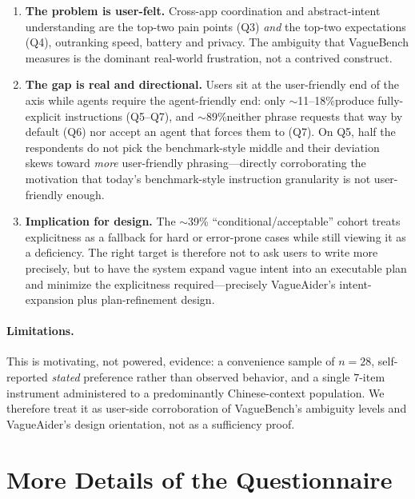 \documentclass[11pt]{article}
\newcommand{\pct}{\%}
\begin{document}
\begin{enumerate}
  \item \textbf{The problem is user-felt.} Cross-app coordination and
  abstract-intent understanding are the top-two pain points (Q3) \emph{and} the
  top-two expectations (Q4), outranking speed, battery and privacy. The
  ambiguity that VagueBench measures is the dominant real-world frustration, not
  a contrived construct.
  \item \textbf{The gap is real and directional.} Users sit at the
  user-friendly end of the axis while agents require the agent-friendly end:
  only $\sim$11--18\pct produce fully-explicit instructions (Q5--Q7), and
  $\sim$89\pct neither phrase requests that way by default (Q6) nor accept an
  agent that forces them to (Q7). On Q5, half the respondents do not pick the
  benchmark-style middle and their deviation skews toward \emph{more}
  user-friendly phrasing---directly corroborating the motivation that today's
  benchmark-style instruction granularity is not user-friendly enough.
  \item \textbf{Implication for design.} The $\sim$39\pct
  ``conditional/acceptable'' cohort treats explicitness as a fallback for hard
  or error-prone cases while still viewing it as a deficiency. The right target
  is therefore not to ask users to write more precisely, but to have the system
  expand vague intent into an executable plan and minimize the explicitness
  required---precisely VagueAider's intent-expansion plus plan-refinement design.
\end{enumerate}

\paragraph{Limitations.}
This is motivating, not powered, evidence: a convenience sample of $n{=}28$,
self-reported \emph{stated} preference rather than observed behavior, and a
single $7$-item instrument administered to a predominantly Chinese-context
population. We therefore treat it as user-side corroboration of VagueBench's
ambiguity levels and VagueAider's design orientation, not as a sufficiency proof.


\appendix
\section{More Details of the Questionnaire}
\label{app:survey}
\end{document}
